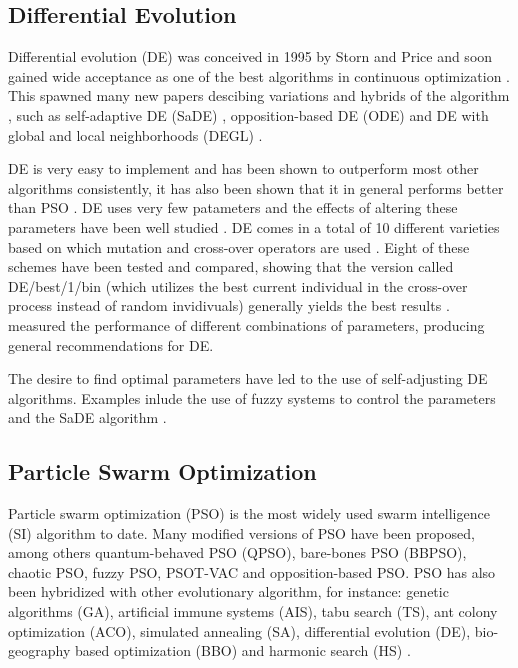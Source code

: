\subsection{Differential Evolution}

Differential evolution (DE) was conceived in 1995 by Storn and Price \cite{storn1995differential} and soon gained wide acceptance as one of the best algorithms in continuous optimization \cite{price1997differential}. This spawned many new papers descibing variations and hybrids of the algorithm \cite{5601760}, such as self-adaptive DE (SaDE) \cite{qin2009differential}, opposition-based DE (ODE) \cite{rahnamayan2008opposition} and DE with global and local neighborhoods (DEGL) \cite{rahnamayan2008opposition}.

DE is very easy to implement and has been shown to outperform most other algorithms consistently, it has also been shown that it in general performs better than PSO \cite{das2009differential, vesterstrom2004comparative}. DE uses very few patameters and the effects of altering these parameters have been well studied \cite{5601760}. DE comes in a total of 10 different varieties based on which mutation and cross-over operators are used \cite{price2006differential}. Eight of these schemes have been tested and compared, showing that the version called DE/best/1/bin (which utilizes the best current individual in the cross-over process instead of random invidivuals) generally yields the best results \cite{mezura2006comparative}. \cite{gamperle2002parameter} measured the performance of different combinations of parameters, producing general recommendations for DE.

The desire to find optimal parameters have led to the use of self-adjusting DE algorithms. Examples inlude the use of fuzzy systems to control the parameters \cite{liu2005fuzzy} and the SaDE algorithm \cite{qin2009differential}.

\subsection{Particle Swarm Optimization}

Particle swarm optimization (PSO) is the most widely used swarm intelligence (SI) algorithm to date. Many modified versions of PSO have been proposed, among others quantum-behaved PSO (QPSO), bare-bones PSO (BBPSO), chaotic PSO, fuzzy PSO, PSOT-VAC and opposition-based PSO. PSO has also been hybridized with other evolutionary algorithm, for instance: genetic algorithms (GA), artificial immune systems (AIS), tabu search (TS), ant colony optimization (ACO), simulated annealing (SA), differential evolution (DE), bio-geography based optimization (BBO) and harmonic search (HS) \cite{zhang2015comprehensive}.

